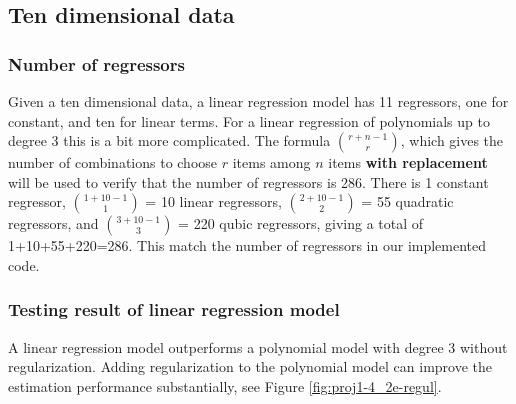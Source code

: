 \documentclass[]{article}
\begin{document}
\subsection{Ten dimensional data} 

\subsubsection{Number of regressors}
Given a ten dimensional data, a linear regression model has 11 regressors, one for constant, and ten for linear terms. For a linear regression of polynomials up to degree 3 this is a bit more complicated. The formula ${r+n-1}\choose{r}$, which gives the number of combinations to choose $r$ items among $n$ items \textbf{with replacement} will be used to verify that the number of regressors is 286. There is 1 constant regressor, ${1+10-1}\choose{1}$ = 10 linear regressors, ${2+10-1}\choose{2}$ = 55 quadratic regressors, and ${3+10-1}\choose{3}$ = 220 qubic regressors, giving a total of 1+10+55+220=286. This match the number of regressors in our implemented code.

\subsubsection{Testing result of linear regression model}
A linear regression model outperforms a polynomial model with degree 3 without regularization. Adding regularization to the polynomial model can improve the estimation performance substantially, see Figure \ref{fig:proj1-4_2e-regul}.
\end{document}
